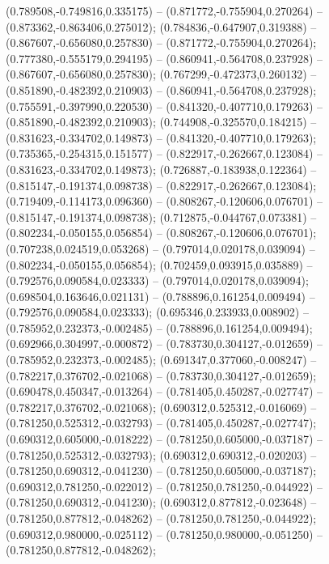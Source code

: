  (0.789508,-0.749816,0.335175) -- (0.871772,-0.755904,0.270264) -- (0.873362,-0.863406,0.275012);
 (0.784836,-0.647907,0.319388) -- (0.867607,-0.656080,0.257830) -- (0.871772,-0.755904,0.270264);
 (0.777380,-0.555179,0.294195) -- (0.860941,-0.564708,0.237928) -- (0.867607,-0.656080,0.257830);
 (0.767299,-0.472373,0.260132) -- (0.851890,-0.482392,0.210903) -- (0.860941,-0.564708,0.237928);
 (0.755591,-0.397990,0.220530) -- (0.841320,-0.407710,0.179263) -- (0.851890,-0.482392,0.210903);
 (0.744908,-0.325570,0.184215) -- (0.831623,-0.334702,0.149873) -- (0.841320,-0.407710,0.179263);
 (0.735365,-0.254315,0.151577) -- (0.822917,-0.262667,0.123084) -- (0.831623,-0.334702,0.149873);
 (0.726887,-0.183938,0.122364) -- (0.815147,-0.191374,0.098738) -- (0.822917,-0.262667,0.123084);
 (0.719409,-0.114173,0.096360) -- (0.808267,-0.120606,0.076701) -- (0.815147,-0.191374,0.098738);
 (0.712875,-0.044767,0.073381) -- (0.802234,-0.050155,0.056854) -- (0.808267,-0.120606,0.076701);
 (0.707238,0.024519,0.053268) -- (0.797014,0.020178,0.039094) -- (0.802234,-0.050155,0.056854);
 (0.702459,0.093915,0.035889) -- (0.792576,0.090584,0.023333) -- (0.797014,0.020178,0.039094);
 (0.698504,0.163646,0.021131) -- (0.788896,0.161254,0.009494) -- (0.792576,0.090584,0.023333);
 (0.695346,0.233933,0.008902) -- (0.785952,0.232373,-0.002485) -- (0.788896,0.161254,0.009494);
 (0.692966,0.304997,-0.000872) -- (0.783730,0.304127,-0.012659) -- (0.785952,0.232373,-0.002485);
 (0.691347,0.377060,-0.008247) -- (0.782217,0.376702,-0.021068) -- (0.783730,0.304127,-0.012659);
 (0.690478,0.450347,-0.013264) -- (0.781405,0.450287,-0.027747) -- (0.782217,0.376702,-0.021068);
 (0.690312,0.525312,-0.016069) -- (0.781250,0.525312,-0.032793) -- (0.781405,0.450287,-0.027747);
 (0.690312,0.605000,-0.018222) -- (0.781250,0.605000,-0.037187) -- (0.781250,0.525312,-0.032793);
 (0.690312,0.690312,-0.020203) -- (0.781250,0.690312,-0.041230) -- (0.781250,0.605000,-0.037187);
 (0.690312,0.781250,-0.022012) -- (0.781250,0.781250,-0.044922) -- (0.781250,0.690312,-0.041230);
 (0.690312,0.877812,-0.023648) -- (0.781250,0.877812,-0.048262) -- (0.781250,0.781250,-0.044922);
 (0.690312,0.980000,-0.025112) -- (0.781250,0.980000,-0.051250) -- (0.781250,0.877812,-0.048262);
